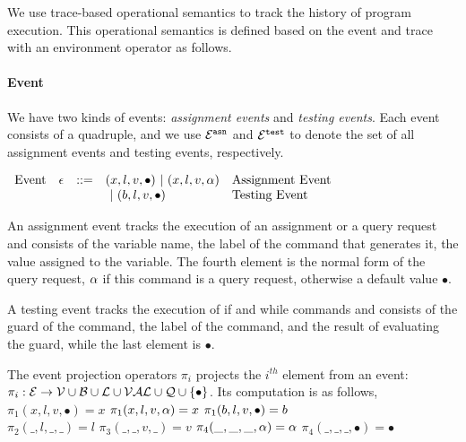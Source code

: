 

We use trace-based operational semantics to track the history of program execution.
This operational semantics is defined based on the event and trace with an environment operator as follows.


\paragraph{Event}
We have two kinds of events: \emph{assignment events} and \emph{testing events}. 
Each event consists of a quadruple,
and we use $\mathcal{E}^{\mathtt{{asn}}}$ and $\mathcal{E}^{\mathtt{{test}}}$ to denote the set of all assignment events and testing events, respectively.
\begin{center}
$ \begin{array}{lllll}
\mbox{Event} 
& \mathtt{\epsilon} & ::= & 
({x}, l, v, \bullet) ~|~ ({x}, l, v, \alpha) & \mbox{Assignment Event} \\
&&& ~|~(b, l, v, \bullet) & \mbox{Testing Event}
\\
\end{array}$
\end{center}
An assignment event tracks the execution of an assignment or a query request and consists of the variable name, the label of the command that generates it, the value assigned to the variable.
The fourth element is the normal form of the query request, $\alpha$ if this command is a query request, otherwise a default value $\bullet$.

A testing event tracks the execution of if and while commands and consists of the guard of the command, the label of the command, and the result of evaluating the guard, while the last element is $\bullet$.

The event projection operators $\pi_i$ projects the $i^{th}$ element from an event:
$ \pi_i : 
\mathcal{E} \to \mathcal{V} \cup \mathcal{B} \cup \mathcal{L} \cup \mathcal{VAL} \cup \mathcal{Q} \cup\{\bullet\} $.
Its computation is as follows,
\\
$\pi_1(x, l, v, \bullet) = x $ \qquad $\pi_1({x}, l, v, \alpha) = x$ \qquad $ \pi_1(b, l, v, \bullet) = b$
\\
$\pi_2(\_, l, \_, \_ ) = l$
\qquad
$\pi_3(\_, \_, v, \_) = v$
\qquad
$\pi_4(\_, \_, \_, \alpha) = \alpha$ \qquad $\pi_4(\_, \_, \_, \bullet) = \bullet$


